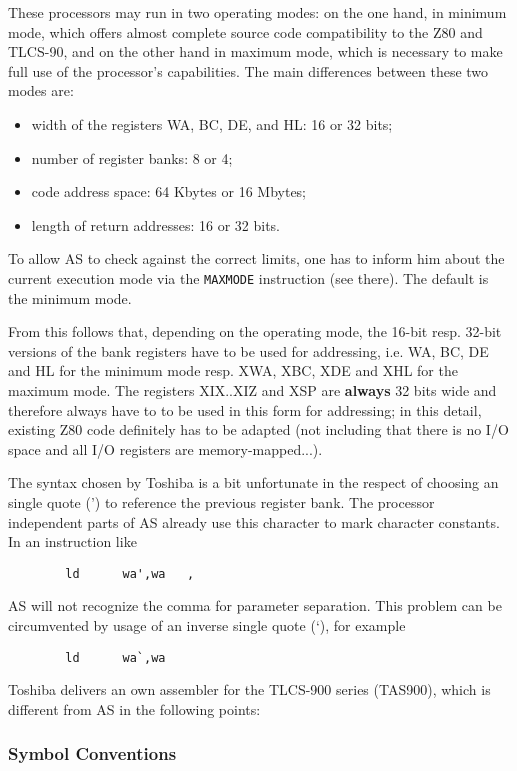 \documentclass[12pt,twoside]{report}
\newcommand{\bb}[1]{{\bf #1}}
\newcommand{\tty}[1]{{\tt #1}}
\begin{document}
These processors may run in two operating modes: on the one hand, in
minimum mode, which offers almost complete source code compatibility
to the Z80 and TLCS-90, and on the other hand in maximum mode, which
is necessary to make full use of the processor's capabilities.  The
main differences between these two modes are:
\begin{itemize}
\item{width of the registers WA, BC, DE, and HL: 16 or 32 bits;}
\item{number of register banks: 8 or 4;}
\item{code address space: 64 Kbytes or 16 Mbytes;}
\item{length of return addresses: 16 or 32 bits.}
\end{itemize}
To allow AS to check against the correct limits, one has to inform him
about the current execution mode via the \tty{MAXMODE} instruction (see
there).  The default is the minimum mode.

From this follows that, depending on the operating mode, the 16-bit
resp. 32-bit versions of the bank registers have to be used for
addressing, i.e. WA, BC, DE and HL for the minimum mode resp. XWA,
XBC, XDE and XHL for the maximum mode.  The registers XIX..XIZ and
XSP are \bb{always} 32 bits wide and therefore always have to to be used
in this form for addressing; in this detail, existing Z80 code
definitely has to be adapted (not including that there is no I/O
space and all I/O registers are memory-mapped...).

The syntax chosen by Toshiba is a bit unfortunate in the respect of
choosing an single quote (') to reference the previous register bank.  The
processor independent parts of AS already use this character to mark
character constants.  In an instruction like
\begin{verbatim}
        ld      wa',wa   ,
\end{verbatim}
AS will not recognize the comma for parameter separation.  This
problem can be circumvented by usage of an inverse single quote (`), for
example
\begin{verbatim}
        ld      wa`,wa                              
\end{verbatim}
Toshiba delivers an own assembler for the TLCS-900 series (TAS900),
which is different from AS in the following points:

\subsubsection{Symbol Conventions}
\end{document}
